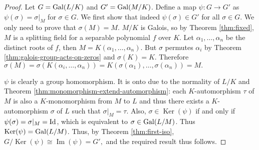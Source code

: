\begin{proof}
	Let $G = \operatorname{Gal}(L/K)$ and $G' = \operatorname{Gal}(M/K)$. Define a map $\psi: G \to G'$ as $\psi(\sigma) = \sigma | _M$ for $\sigma \in G$. We first show that indeed $\psi(\sigma) \in G'$ for all $\sigma \in G$. We only need to prove that $\sigma(M) = M$. $M/K$ is Galois, so by Theorem \ref{thm:fixed}, $M$ is a splitting field for a separable polynomial $f$ over $K$. Let $\alpha_1, \dots, \alpha_n$ be the distinct roots of $f$, then $M = K(\alpha_1, \ldots, \alpha_n)$. But $\sigma$ permutes $\alpha_i$ by Theorem \ref{thm:galois-group-acts-on-zeros} and $\sigma(K) = K$. Therefore $\sigma(M) = \sigma(K(\alpha_i, \ldots, \alpha_n)) = K(\sigma(\alpha_1), \ldots, \sigma(\alpha_n)) = M. $
	
	
	 $\psi$ is clearly a group homomorphism. It is onto due to the normality of $L/K$ and Theorem \ref{thm:monomorphism-extend-automorphism}: each $K$-automorphism $\tau$ of $M$ is also a $K$-monomorphism from $M$ to $L$ and thus there exists a $K$-automorphism $\sigma$ of $L$ such that $\sigma | _M = \tau$. Also, $\sigma \in \operatorname{Ker}(\psi)$ if and only if $\psi(\sigma) = \sigma |_M = \operatorname{Id}$, which is equivalent to $\sigma \in \operatorname{Gal}(L/M)$. Thus $\operatorname{Ker}(\psi) = \operatorname{Gal}(L/M)$. Thus, by Theorem \ref{thm:first-iso}, 
	$G / \operatorname{Ker}(\psi) \cong \operatorname{Im}(\psi) = G',$
	and the required result thus follows. 
\end{proof}


%	
%    
%    
%


